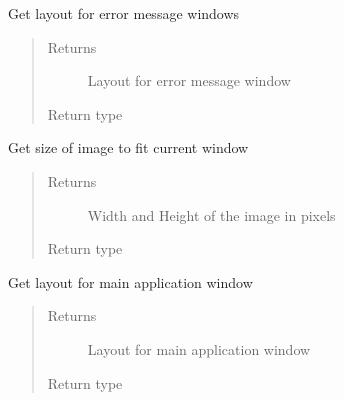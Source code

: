 \documentclass[letterpaper,10pt,english]{sphinxmanual}
\begin{document}
\begin{fulllineitems}
\label{\detokenize{layout:layout.get_error_layout}}
\sphinxAtStartPar
Get layout for error message windows
\begin{quote}\begin{description}
\item[{Returns}] \leavevmode
\sphinxAtStartPar
Layout for error message window

\item[{Return type}] \leavevmode
\sphinxAtStartPar
{}

\end{description}\end{quote}

\end{fulllineitems}


\begin{fulllineitems}
\label{\detokenize{layout:layout.get_fig_size}}
\sphinxAtStartPar
Get size of image to fit current window
\begin{quote}\begin{description}
\item[{Returns}] \leavevmode
\sphinxAtStartPar
Width and Height of the image in pixels

\item[{Return type}] \leavevmode
\sphinxAtStartPar
{}

\end{description}\end{quote}

\end{fulllineitems}


\begin{fulllineitems}
\label{\detokenize{layout:layout.get_layout}}
\sphinxAtStartPar
Get layout for main application window
\begin{quote}\begin{description}
\item[{Returns}] \leavevmode
\sphinxAtStartPar
Layout for main application window

\item[{Return type}] \leavevmode
\sphinxAtStartPar
{}

\end{description}\end{quote}

\end{fulllineitems}
\end{document}
